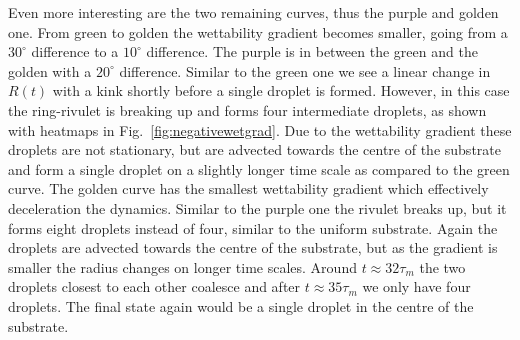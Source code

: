 \documentclass[twoside,twocolumn,9pt]{article}
\begin{document}
Even more interesting are the two remaining curves, thus the purple and golden one.
From green to golden the wettability gradient becomes smaller, going from a $30^{\circ}$ difference to a $10^{\circ}$ difference.
The purple is in between the green and the golden with a $20^{\circ}$ difference. 
Similar to the green one we see a linear change in $R(t)$ with a kink shortly before a single droplet is formed.
However, in this case the ring-rivulet is breaking up and forms four intermediate droplets, as shown with heatmaps in Fig.~\ref{fig:negativewetgrad}.
Due to the wettability gradient these droplets are not stationary, but are advected towards the centre of the substrate and form a single droplet on a slightly longer time scale as compared to the green curve.
The golden curve has the smallest wettability gradient which effectively deceleration the dynamics.
Similar to the purple one the rivulet breaks up, but it forms eight droplets instead of four, similar to the uniform substrate.
Again the droplets are advected towards the centre of the substrate, but as the gradient is smaller the radius changes on longer time scales. 
Around $t\approx 32\tau_m$ the two droplets closest to each other coalesce and after $t\approx 35\tau_m$ we only have four droplets.
The final state again would be a single droplet in the centre of the substrate.
\end{document}
